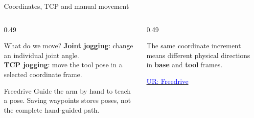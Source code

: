 \documentclass[aspectratio=169]{beamer}
\begin{document}
\begin{frame}[t]{Coordinates, TCP and manual movement}
    \small
    \begin{columns}[T,onlytextwidth]
        \begin{column}{0.49\textwidth}
            \begin{block}{What do we move?}
                \textbf{Joint jogging}: change an individual joint angle.\\
                \textbf{TCP jogging}: move the tool pose in a selected coordinate frame.
            \end{block}
            \begin{block}{Freedrive}
                Guide the arm by hand to teach a pose. Saving waypoints stores poses, not the complete hand-guided path.
            \end{block}
        \end{column}
        \begin{column}{0.49\textwidth}
            \centering
            \par\raggedright The same coordinate increment means different physical directions in \textbf{base} and \textbf{tool} frames.
            \medskip

            \href{https://www.universal-robots.com/manuals/EN/HTML/SW5_23/Content/prod-usr-man/complianceUR12e/H_g5_sections/firstuse/Freedrive_ur20_en.htm}{\textcolor{blue}{UR: Freedrive}}
        \end{column}
    \end{columns}
\end{frame}
\end{document}
